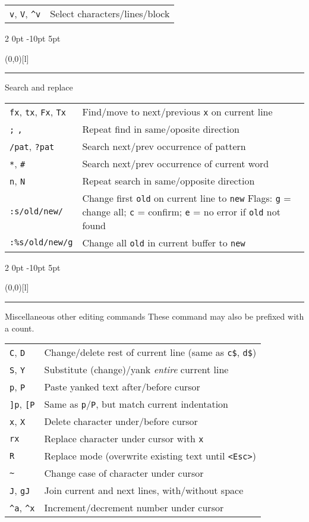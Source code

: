 \documentclass[a4paper, landscape, 10pt]{article}
\makeatletter
\renewcommand{\subsection}{%
    \@startsection{subsection}%
        {2}%
        {0pt}%
        {-10pt}%
        {5pt}%
        {\protect\makebox(0,0)[l]{\color{accentcolor!20}\rule[7pt]{\columnwidth}{19pt}}\hspace{.5em}\fontsize{12pt}{12pt}\selectfont\bfseries\itshape\color{accentcolor}}}
\newcommand{\V}[1]{\texttt{\textup{#1}}}
\makeatother
\begin{document}
\begin{multicols*}{3}
    \begin{tabularx}{\columnwidth}{l>{\raggedright\arraybackslash}X}
\verb|v|, \verb|V|, \verb|^v|
        &Select characters/lines/block
    \end{tabularx}

\subsection{Search and replace}
    \begin{tabularx}{\columnwidth}{l>{\raggedright\arraybackslash}X}
\V{fx}, \V{tx}, \V{Fx}, \V{Tx}
        &Find/move to next/previous \V{x} on current line\\
\V{;} \V{,}
        &Repeat find in same/oposite direction\\
\V{/pat}, \V{?pat}
        &Search next/prev occurrence of pattern\\
\V{*}, \verb|#|
        &Search next/prev occurrence of current word\\
\V{n}, \V{N}
        &Repeat search in same/opposite direction\\
\V{:s/old/new/}
        &Change first \V{old} on current line to \V{new}
        \linebreak Flags: \V{g} = change all; \V{c} = confirm;
        \linebreak \V{e} = no error if \V{old} not found
        \\
\V{:\%s/old/new/g}
        &Change all \V{old} in current buffer to \V{new}
    \end{tabularx}

\subsection{Miscellaneous other editing commands}
These command may also be prefixed with a count.
\vspace{.25\baselineskip}

    \begin{tabularx}{\columnwidth}{l>{\raggedright\arraybackslash}X}
\V{C}, \V{D}
        &Change/delete rest of current line (same as \verb|c$|, \verb|d$|)\\
\V{S}, \V{Y}
        &Substitute (change)/yank \emph{entire} current line\\
\V{p}, \V{P}
        &Paste yanked text after/before cursor\\
\V{]p}, \V{[P}
        &Same as \V{p}/\V{P}, but match current indentation\\
\V{x}, \V{X}
        &Delete character under/before cursor\\
\V{rx}
        &Replace character under cursor with \V{x}\\
\V{R}
        &Replace mode (overwrite existing text until \V{<Esc>})\\
\verb|~|
        &Change case of character under cursor\\
\V{J}, \V{gJ}
        &Join current and next lines, with/without space\\
\verb|^a|, \verb|^x|
        &Increment/decrement number under cursor
    \end{tabularx}


\end{multicols*}
\end{document}
